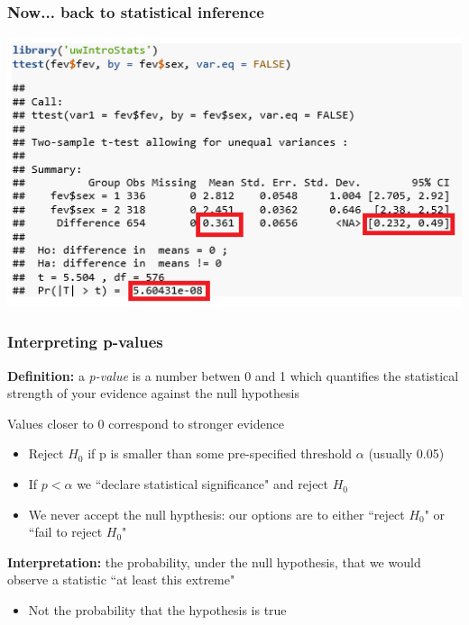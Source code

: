 \documentclass[12pt, 
hyperref={colorlinks=true, linkcolor=blue, urlcolor=cyan}]{beamer}
\begin{document}
\begin{frame}
\frametitle{Now... back to statistical inference}

\hspace*{-1cm} \includegraphics[width=\paperwidth]{./t-test-bug-fixed-highlights}

\end{frame}



\begin{frame}
\frametitle{Interpreting p-values}

\textbf{Definition:} a \textit{p-value} is a number betwen 0 and 1 which quantifies the statistical strength of your evidence against the null hypothesis

Values closer to 0 correspond to stronger evidence\vspace{-0.3cm}
	\begin{itemize}
	\item Reject $H_0$ if p is smaller than some pre-specified threshold $\alpha$ (usually 0.05)
	\item If $p < \alpha$ we ``declare statistical significance" and reject $H_0$
	\item \color{red} We never accept the null hypthesis: \color{black} our options are to either ``reject $H_0$" or ``fail to reject $H_0$"
	\end{itemize}
\textbf{Interpretation:} the probability, under the null hypothesis, that we would observe a statistic ``at least this extreme"\vspace{-0.3cm}
	\begin{itemize}
	\item \color{red} Not \color{black} the probability that the hypothesis is true
	\end{itemize}

\end{frame}
\end{document}
